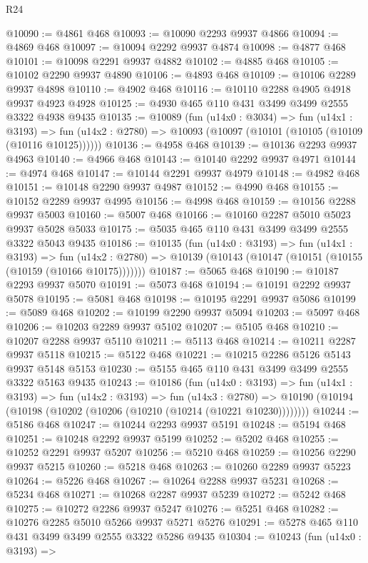 \begin{lexlean}{R24}
\begin{coremodule}
@10090 := @4861 @468
@10093 := @10090 @2293 @9937 @4866
@10094 := @4869 @468
@10097 := @10094 @2292 @9937 @4874
@10098 := @4877 @468
@10101 := @10098 @2291 @9937 @4882
@10102 := @4885 @468
@10105 := @10102 @2290 @9937 @4890
@10106 := @4893 @468
@10109 := @10106 @2289 @9937 @4898
@10110 := @4902 @468
@10116 := @10110 @2288 @4905 @4918 @9937 @4923 @4928
@10125 := @4930 @465 @110 @431 @3499 @3499 @2555 @3322 @4938 @9435
@10135 := @10089
    (fun (u14x0 : @3034) =>
    fun (u14x1 : @3193) =>
    fun (u14x2 : @2780) => @10093 (@10097 (@10101 (@10105 (@10109 (@10116 @10125))))))
@10136 := @4958 @468
@10139 := @10136 @2293 @9937 @4963
@10140 := @4966 @468
@10143 := @10140 @2292 @9937 @4971
@10144 := @4974 @468
@10147 := @10144 @2291 @9937 @4979
@10148 := @4982 @468
@10151 := @10148 @2290 @9937 @4987
@10152 := @4990 @468
@10155 := @10152 @2289 @9937 @4995
@10156 := @4998 @468
@10159 := @10156 @2288 @9937 @5003
@10160 := @5007 @468
@10166 := @10160 @2287 @5010 @5023 @9937 @5028 @5033
@10175 := @5035 @465 @110 @431 @3499 @3499 @2555 @3322 @5043 @9435
@10186 := @10135
    (fun (u14x0 : @3193) =>
    fun (u14x1 : @3193) =>
    fun (u14x2 : @2780) => @10139 (@10143 (@10147 (@10151 (@10155 (@10159 (@10166 @10175)))))))
@10187 := @5065 @468
@10190 := @10187 @2293 @9937 @5070
@10191 := @5073 @468
@10194 := @10191 @2292 @9937 @5078
@10195 := @5081 @468
@10198 := @10195 @2291 @9937 @5086
@10199 := @5089 @468
@10202 := @10199 @2290 @9937 @5094
@10203 := @5097 @468
@10206 := @10203 @2289 @9937 @5102
@10207 := @5105 @468
@10210 := @10207 @2288 @9937 @5110
@10211 := @5113 @468
@10214 := @10211 @2287 @9937 @5118
@10215 := @5122 @468
@10221 := @10215 @2286 @5126 @5143 @9937 @5148 @5153
@10230 := @5155 @465 @110 @431 @3499 @3499 @2555 @3322 @5163 @9435
@10243 := @10186
    (fun (u14x0 : @3193) =>
    fun (u14x1 : @3193) =>
    fun (u14x2 : @3193) =>
    fun (u14x3 : @2780) =>
    @10190 (@10194 (@10198 (@10202 (@10206 (@10210 (@10214 (@10221 @10230))))))))
@10244 := @5186 @468
@10247 := @10244 @2293 @9937 @5191
@10248 := @5194 @468
@10251 := @10248 @2292 @9937 @5199
@10252 := @5202 @468
@10255 := @10252 @2291 @9937 @5207
@10256 := @5210 @468
@10259 := @10256 @2290 @9937 @5215
@10260 := @5218 @468
@10263 := @10260 @2289 @9937 @5223
@10264 := @5226 @468
@10267 := @10264 @2288 @9937 @5231
@10268 := @5234 @468
@10271 := @10268 @2287 @9937 @5239
@10272 := @5242 @468
@10275 := @10272 @2286 @9937 @5247
@10276 := @5251 @468
@10282 := @10276 @2285 @5010 @5266 @9937 @5271 @5276
@10291 := @5278 @465 @110 @431 @3499 @3499 @2555 @3322 @5286 @9435
@10304 := @10243
    (fun (u14x0 : @3193) =>

\end{coremodule}
\end{lexlean}
